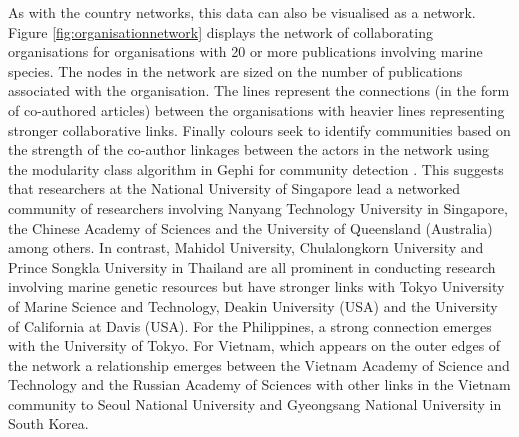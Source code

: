 \documentclass[openany]{book}
\theoremstyle{definition}
\theoremstyle{definition}
\theoremstyle{definition}
\theoremstyle{remark}
\begin{document}
As with the country networks, this data can also be visualised as a
network. Figure \ref{fig:organisationnetwork} displays the network of
collaborating organisations for organisations with 20 or more
publications involving marine species. The nodes in the network are
sized on the number of publications associated with the organisation.
The lines represent the connections (in the form of co-authored
articles) between the organisations with heavier lines representing
stronger collaborative links. Finally colours seek to identify
communities based on the strength of the co-author linkages between the
actors in the network using the modularity class algorithm in Gephi for
community detection \citep{Blondel_2008}. This suggests that researchers
at the National University of Singapore lead a networked community of
researchers involving Nanyang Technology University in Singapore, the
Chinese Academy of Sciences and the University of Queensland (Australia)
among others. In contrast, Mahidol University, Chulalongkorn University
and Prince Songkla University in Thailand are all prominent in
conducting research involving marine genetic resources but have stronger
links with Tokyo University of Marine Science and Technology, Deakin
University (USA) and the University of California at Davis (USA). For
the Philippines, a strong connection emerges with the University of
Tokyo. For Vietnam, which appears on the outer edges of the network a
relationship emerges between the Vietnam Academy of Science and
Technology and the Russian Academy of Sciences with other links in the
Vietnam community to Seoul National University and Gyeongsang National
University in South Korea.
\end{document}
